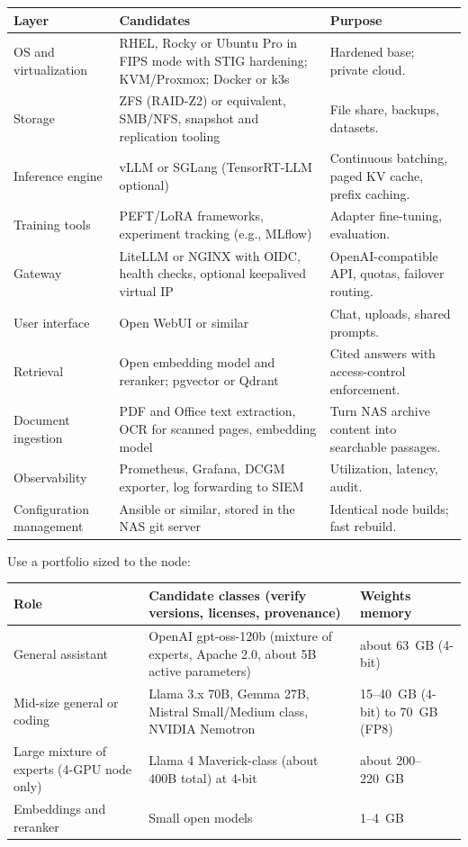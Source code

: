 {\footnotesize
\begin{xltabular}{\textwidth}{@{}l Y{1.231} Y{0.769}@{}}
  \toprule
  Layer & Candidates & Purpose \\
  \midrule
  \endhead
  OS and virtualization & RHEL, Rocky or Ubuntu Pro in FIPS mode with STIG hardening; KVM/Proxmox; Docker or k3s & Hardened base; private cloud. \\
  Storage & ZFS (RAID-Z2) or equivalent, SMB/NFS, snapshot and replication tooling & File share, backups, datasets. \\
  Inference engine & vLLM or SGLang (TensorRT-LLM optional) & Continuous batching, paged KV cache, prefix caching. \\
  Training tools & PEFT/LoRA frameworks, experiment tracking (e.g., MLflow) & Adapter fine-tuning, evaluation. \\
  Gateway & LiteLLM or NGINX with OIDC, health checks, optional keepalived virtual IP & OpenAI-compatible API, quotas, failover routing. \\
  User interface & Open WebUI or similar & Chat, uploads, shared prompts. \\
  Retrieval & Open embedding model and reranker; pgvector or Qdrant & Cited answers with access-control enforcement. \\
  Document ingestion & PDF and Office text extraction, OCR for scanned pages, embedding model & Turn NAS archive content into searchable passages. \\
  Observability & Prometheus, Grafana, DCGM exporter, log forwarding to SIEM & Utilization, latency, audit. \\
  Configuration management & Ansible or similar, stored in the NAS git server & Identical node builds; fast rebuild. \\
  \bottomrule
\end{xltabular}}

Use a portfolio sized to the node:

{\small
\begin{xltabular}{\textwidth}{@{}Y{0.844}Y{1.5}Y{0.656}@{}}
  \toprule
  Role & Candidate classes (verify versions, licenses, provenance) & Weights memory \\
  \midrule
  \endhead
  General assistant & OpenAI gpt-oss-120b (mixture of experts, Apache 2.0, about 5B active parameters) & about 63~GB (4-bit) \\
  Mid-size general or coding & Llama 3.x 70B, Gemma 27B, Mistral Small/Medium class, NVIDIA Nemotron & 15--40~GB (4-bit) to 70~GB (FP8) \\
  Large mixture of experts (4-GPU node only) & Llama 4 Maverick-class (about 400B total) at 4-bit & about 200--220~GB \\
  Embeddings and reranker & Small open models & 1--4~GB \\
  \bottomrule
\end{xltabular}}

